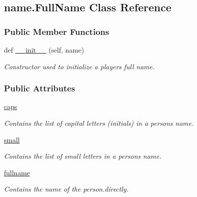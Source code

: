 \hypertarget{classname_1_1FullName}{}\subsection{name.\+Full\+Name Class Reference}
\label{classname_1_1FullName}
\subsubsection*{Public Member Functions}
\begin{DoxyCompactItemize}
\item 
def \hyperlink{classname_1_1FullName_a28652799b3836b5dbad3504fdc70c34c}{\+\_\+\+\_\+init\+\_\+\+\_\+} (self, name)
\begin{DoxyCompactList}\small\item\em Constructor used to initialize a player\textquotesingle{}s full name. \end{DoxyCompactList}\end{DoxyCompactItemize}
\subsubsection*{Public Attributes}
\begin{DoxyCompactItemize}
\item 
\mbox{\label{classname_1_1FullName_a1396db512f0e5045ea16903b4076c42c}} 
\hyperlink{classname_1_1FullName_a1396db512f0e5045ea16903b4076c42c}{caps}
\begin{DoxyCompactList}\small\item\em Contains the list of capital letters (initials) in a person\textquotesingle{}s name. \end{DoxyCompactList}\item 
\mbox{\label{classname_1_1FullName_a0802709ba7dc9d56967101dc31e62cd1}} 
\hyperlink{classname_1_1FullName_a0802709ba7dc9d56967101dc31e62cd1}{small}
\begin{DoxyCompactList}\small\item\em Contains the list of small letters in a person\textquotesingle{}s name. \end{DoxyCompactList}\item 
\mbox{\label{classname_1_1FullName_ab0b7ed4fb596e48365b6bb3a23140449}} 
\hyperlink{classname_1_1FullName_ab0b7ed4fb596e48365b6bb3a23140449}{fullname}
\begin{DoxyCompactList}\small\item\em Contains the name of the person.\+directly. \end{DoxyCompactList}\end{DoxyCompactItemize}


